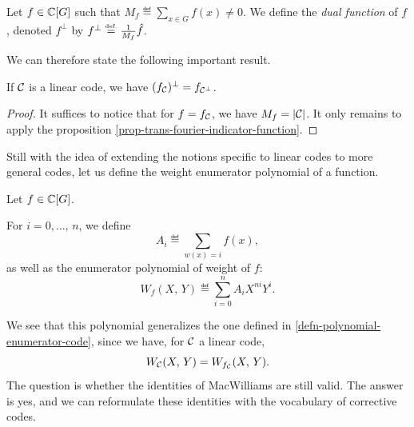 \begin{defn}
 Let $ f \in \mathbb{C} [G] $ such that $ M_f \eqdef \sum_{x \in G}{f(x)} \neq 0 $. We define the \textit{dual function} of $ f $, denoted $ f^\bot $ by $ f^\bot \stackrel{\mbox{\upshape\tiny def.}}{=} \tfrac{1}{M_f} \hat{f} $.
\end{defn}

We can therefore state the following important result.
 
\begin{prop}
If $ \mathcal{C} $ is a linear code, we have $ (f_{\mathcal{C}})^\bot = f_{\mathcal{C}^\bot} $.
\end{prop}
\begin{proof}
It suffices to notice that for $ f = f_{\mathcal{C}} $, we have $ M_f = | \mathcal{C} | $. It only remains to apply the proposition \ref{prop-trans-fourier-indicator-function}.
\end{proof}
Still with the idea of extending the notions specific to linear codes to more general codes, let us define the weight enumerator polynomial of a function.
 
\begin{defn}
 Let $ f \in \mathbb{C} [G] $.
 
For $ i = 0, \ldots, \, n $, we define
\begin{equation*}
A_i \eqdef \sum_{w (x) = i}{f(x)},
\end{equation*}
as well as the enumerator polynomial of weight of $ f $:
\begin{equation*}
W_f(X, \, Y) \eqdef \sum_{i = 0}^n{A_i X^{ni} Y^i}.
\end{equation*}
\end{defn}
We see that this polynomial generalizes the one defined in \ref{defn-polynomial-enumerator-code}, since we have, for $ \mathcal{C} $ a linear code,
\begin{equation*}
W_{\mathcal{C}} (X, \, Y) = W_{f_{\mathcal{C}}} (X, \, Y).
\end{equation*}
The question is whether the identities of MacWilliams are still valid. The answer is yes, and we can reformulate these identities with the vocabulary of corrective codes.
 
